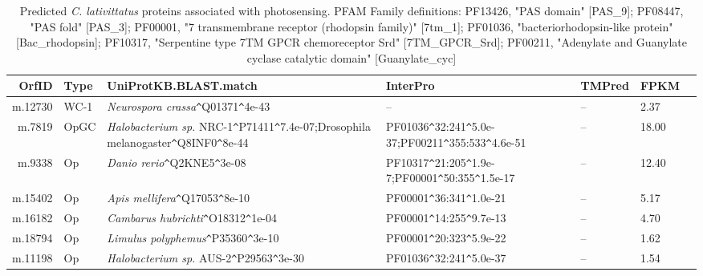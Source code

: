 \begin{table}[hp]
\caption[\textit{C. lativittatus} photosensing proteins]{Predicted \textit{C. lativittatus} proteins associated with photosensing. PFAM Family definitions: PF13426, "PAS domain" [PAS\_9]; PF08447, "PAS fold" [PAS\_3]; PF00001, "7 transmembrane receptor (rhodopsin family)" [7tm\_1]; PF01036, "bacteriorhodopsin-like protein" [Bac\_rhodopsin]; PF10317, "Serpentine type 7TM GPCR chemoreceptor Srd" [7TM\_GPCR\_Srd]; PF00211, "Adenylate and Guanylate cyclase catalytic domain" [Guanylate\_cyc]} 
\label{tab:ChClat_photosensing}
\begin{tabular}{rlllllr}
  \hline
\hline
  OrfID & Type & UniProtKB.BLAST.match & InterPro & TMPred & FPKM \\ 
  \hline
  m.12730 & WC-1 & \emph{Neurospora crassa}\verb|^|Q01371\verb|^|4e-43 & -- & -- & 2.37 \\ 
  m.7819 & OpGC & \emph{Halobacterium sp.} NRC-1\verb|^|P71411\verb|^|7.4e-07;Drosophila melanogaster\verb|^|Q8INF0\verb|^|8e-44 & PF01036\verb|^|32:241\verb|^|5.0e-37;PF00211\verb|^|355:533\verb|^|4.6e-51 & -- & 18.00 \\ 
  m.9338 & Op & \emph{Danio rerio}\verb|^|Q2KNE5\verb|^|3e-08 & PF10317\verb|^|21:205\verb|^|1.9e-7;PF00001\verb|^|50:355\verb|^|1.5e-17 & -- & 12.40 \\ 
  m.15402 & Op & \emph{Apis mellifera}\verb|^|Q17053\verb|^|8e-10 & PF00001\verb|^|36:341\verb|^|1.0e-21 & -- & 5.17 \\ 
  m.16182 & Op & \emph{Cambarus hubrichti}\verb|^|O18312\verb|^|1e-04 & PF00001\verb|^|14:255\verb|^|9.7e-13 & -- & 4.70 \\ 
  m.18794 & Op & \emph{Limulus polyphemus}\verb|^|P35360\verb|^|3e-10 & PF00001\verb|^|20:323\verb|^|5.9e-22 & -- & 1.62 \\ 
  m.11198 & Op & \emph{Halobacterium sp.} AUS-2\verb|^|P29563\verb|^|3e-30 & PF01036\verb|^|32:241\verb|^|5.0e-37 & -- & 1.54 \\ 
   \hline
\hline
\end{tabular}
\end{table}
